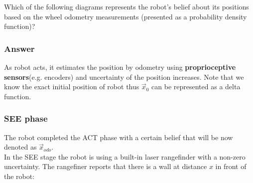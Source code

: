 \documentclass[12pt]{article}
\begin{document}
Which of the following diagrams represents the robot's belief about its positions based on the wheel odometry measurements (presented as a probability density function)?

\pagebreak

\subsubsection*{Answer}

\begin{figure}[h]
\noindent{}
\end{figure}

\noindent As robot acts, it estimates the position by odometry using \textbf{proprioceptive sensors}(e.g. encoders) and uncertainty of the position increases. Note that we know the exact initial position of robot thus $\vec{x}_0$ can be represented as a delta function. 


\subsubsection{SEE phase}

The robot completed the ACT phase with a certain belief that will be now denoted as $\vec{x}_{odo}$. \\

\noindent In the SEE stage the robot is using a built-in laser rangefinder with a non-zero uncertainty. The rangefiner reports that there is a wall at distance $x$ in front of the robot: \\ 

\begin{figure}[h]
\noindent{}
\end{figure}
\end{document}
